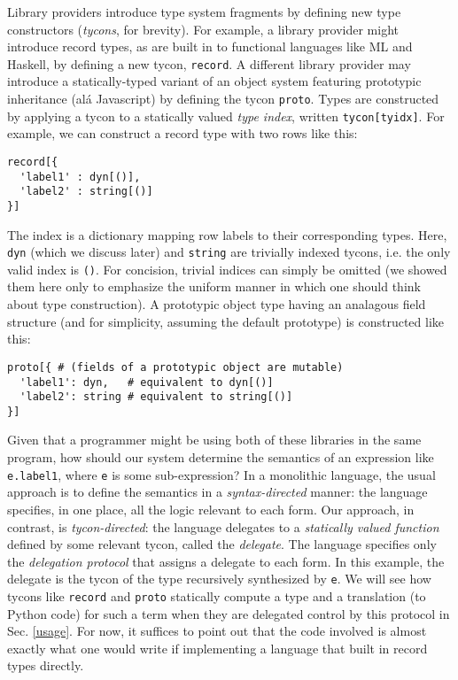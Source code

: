 \documentclass[9pt]{sigplanconf}
\begin{document}
Library providers introduce type system fragments by defining new type constructors (\emph{tycons}, for brevity). For example, a library provider might introduce record types, as are built in to functional languages like ML and Haskell, by defining a new tycon, \lstinline{record}. A different library provider may introduce a statically-typed variant of an object system featuring prototypic inheritance (al\'a Javascript) by defining the tycon \lstinline{proto}. Types are constructed by applying a tycon to a statically valued \emph{type index}, written \lstinline{tycon[tyidx]}. For example, we can construct a record type with two rows like this:
\begin{lstlisting}[numbers=none]
record[{
  'label1' : dyn[()],    
  'label2' : string[()]
}]
\end{lstlisting}
The index is a dictionary mapping row labels to their corresponding types. Here, \lstinline{dyn} (which we discuss later) and \lstinline{string} are trivially indexed tycons, i.e. the only valid index is \lstinline{()}. For concision, trivial indices can simply be omitted (we showed them here only to emphasize the uniform manner in which one should think about type construction). A prototypic object type having an analagous field structure (and for simplicity, assuming the default prototype) is constructed like this:
\begin{lstlisting}[numbers=none]
proto[{ # (fields of a prototypic object are mutable)
  'label1': dyn,   # equivalent to dyn[()]
  'label2': string # equivalent to string[()]
}]
\end{lstlisting}

Given that a programmer might be using both of these libraries in the same program, how should our system determine the semantics of an expression like \lstinline{e.label1}, where \lstinline{e} is some sub-expression? In a monolithic language, the usual approach is to define the semantics in a \emph{syntax-directed} manner: the language specifies, in one place, all the logic relevant to each form. Our approach, in contrast, is \emph{tycon-directed}: the language delegates  to a \emph{statically valued function} defined by some relevant tycon, called the \emph{delegate}. The language specifies only the \emph{delegation protocol} that assigns a delegate to each form. In this example, the delegate is the tycon of the type recursively synthesized by \lstinline{e}. We will see how tycons like \lstinline{record} and \lstinline{proto} statically compute a type and a translation (to Python code) for such a term when they are delegated control by this protocol in Sec. \ref{usage}. For now, it suffices to point out that the code involved is almost exactly what one would write if implementing a language that built in record types directly.
\end{document}
